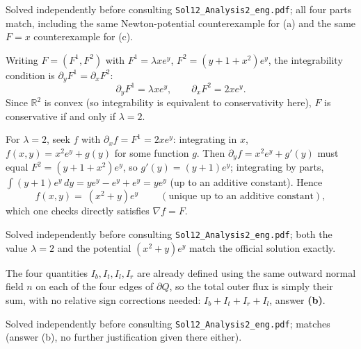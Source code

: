 \begin{ainote}
Solved independently before consulting \texttt{Sol12\_Analysis2\_eng.pdf}; all four parts
match, including the same Newton-potential counterexample for (a) and the same $F=x$
counterexample for (c).
\end{ainote}

\begin{exercisesolution}
Writing $F = (F^1,F^2)$ with $F^1 = \lambda xe^y$, $F^2 = (y+1+x^2)e^y$, the integrability
condition is $\partial_yF^1 = \partial_xF^2$:
\[\partial_yF^1 = \lambda xe^y, \qquad \partial_xF^2 = 2xe^y.\]
Since $\mathbb{R}^2$ is convex (so integrability is equivalent to conservativity here), $F$
is conservative if and only if $\lambda=2$.

For $\lambda=2$, seek $f$ with $\partial_xf = F^1 = 2xe^y$: integrating in $x$,
$f(x,y) = x^2e^y + g(y)$ for some function $g$. Then $\partial_yf = x^2e^y+g'(y)$ must equal
$F^2 = (y+1+x^2)e^y$, so $g'(y) = (y+1)e^y$; integrating by parts, $\int(y+1)e^y\,dy =
ye^y - e^y + e^y = ye^y$ (up to an additive constant). Hence
\[f(x,y) = \boxed{\ (x^2+y)e^y\ } \qquad (\text{unique up to an additive constant}),\]
which one checks directly satisfies $\nabla f = F$.
\end{exercisesolution}

\begin{ainote}
Solved independently before consulting \texttt{Sol12\_Analysis2\_eng.pdf}; both the value
$\lambda=2$ and the potential $(x^2+y)e^y$ match the official solution exactly.
\end{ainote}

\begin{exercisesolution}
The four quantities $I_b,I_t,I_l,I_r$ are already defined using the same outward normal field
$n$ on each of the four edges of $\partial Q$, so the total outer flux is simply their sum,
with no relative sign corrections needed: $\boxed{I_b+I_t+I_r+I_l}$, answer \textbf{(b)}.
\end{exercisesolution}

\begin{ainote}
Solved independently before consulting \texttt{Sol12\_Analysis2\_eng.pdf}; matches (answer
(b), no further justification given there either).
\end{ainote}

